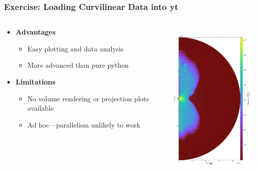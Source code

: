 \documentclass[]{beamer}
\begin{document}
\begin{frame}
  \frametitle{Exercise: Loading Curvilinear Data into yt}
  \begin{columns}
    \begin{column}{6cm}
      \begin{itemize}
      \item \textbf{\color{blue}Advantages}
        \begin{itemize}
        \item Easy plotting and data analysis
        \item More advanced than pure python
        \end{itemize}
      \item \textbf{\color{red}Limitations}
        \begin{itemize}
        \item No volume rendering or projection plots available
        \item Ad hoc---parallelism unlikely to work
        \end{itemize}
      \end{itemize}
    \end{column}
    \begin{column}{6cm}
      \begin{center}
        \includegraphics[height=7.9cm]{figures/harmdisk-xz-slice}
      \end{center}
    \end{column}
  \end{columns}
\end{frame}
\end{document}
